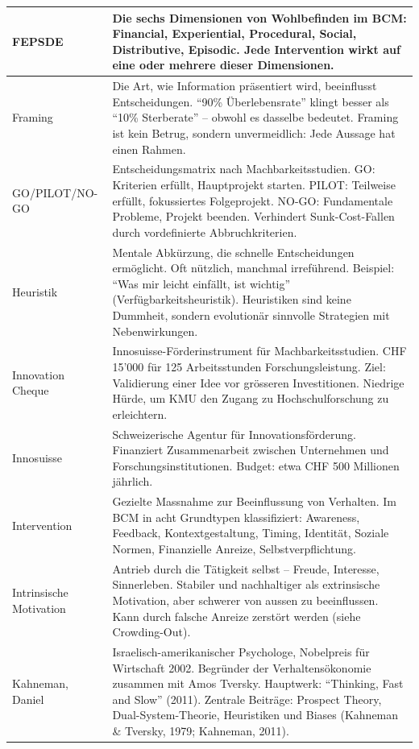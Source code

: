 \documentclass[11pt,a4paper]{article}
\begin{document}
\begin{longtable}{@{}L{4cm}L{10cm}@{}}
\midrule
FEPSDE & Die sechs Dimensionen von Wohlbefinden im BCM: Financial, Experiential, Procedural, Social, Distributive, Episodic. Jede Intervention wirkt auf eine oder mehrere dieser Dimensionen. \\
\midrule
Framing & Die Art, wie Information präsentiert wird, beeinflusst Entscheidungen. ``90\% Überlebensrate'' klingt besser als ``10\% Sterberate'' -- obwohl es dasselbe bedeutet. Framing ist kein Betrug, sondern unvermeidlich: Jede Aussage hat einen Rahmen. \\
\midrule
GO/PILOT/NO-GO & Entscheidungsmatrix nach Machbarkeitsstudien. GO: Kriterien erfüllt, Hauptprojekt starten. PILOT: Teilweise erfüllt, fokussiertes Folgeprojekt. NO-GO: Fundamentale Probleme, Projekt beenden. Verhindert Sunk-Cost-Fallen durch vordefinierte Abbruchkriterien. \\
\midrule
Heuristik & Mentale Abkürzung, die schnelle Entscheidungen ermöglicht. Oft nützlich, manchmal irreführend. Beispiel: ``Was mir leicht einfällt, ist wichtig'' (Verfügbarkeitsheuristik). Heuristiken sind keine Dummheit, sondern evolutionär sinnvolle Strategien mit Nebenwirkungen. \\
\midrule
Innovation Cheque & Innosuisse-Förderinstrument für Machbarkeitsstudien. CHF 15'000 für 125 Arbeitsstunden Forschungsleistung. Ziel: Validierung einer Idee vor grösseren Investitionen. Niedrige Hürde, um KMU den Zugang zu Hochschulforschung zu erleichtern. \\
\midrule
Innosuisse & Schweizerische Agentur für Innovationsförderung. Finanziert Zusammenarbeit zwischen Unternehmen und Forschungsinstitutionen. Budget: etwa CHF 500 Millionen jährlich. \\
\midrule
Intervention & Gezielte Massnahme zur Beeinflussung von Verhalten. Im BCM in acht Grundtypen klassifiziert: Awareness, Feedback, Kontextgestaltung, Timing, Identität, Soziale Normen, Finanzielle Anreize, Selbstverpflichtung. \\
\midrule
Intrinsische Motivation & Antrieb durch die Tätigkeit selbst -- Freude, Interesse, Sinnerleben. Stabiler und nachhaltiger als extrinsische Motivation, aber schwerer von aussen zu beeinflussen. Kann durch falsche Anreize zerstört werden (siehe Crowding-Out). \\
\midrule
Kahneman, Daniel & Israelisch-amerikanischer Psychologe, Nobelpreis für Wirtschaft 2002. Begründer der Verhaltensökonomie zusammen mit Amos Tversky. Hauptwerk: ``Thinking, Fast and Slow'' (2011). Zentrale Beiträge: Prospect Theory, Dual-System-Theorie, Heuristiken und Biases (Kahneman \& Tversky, 1979; Kahneman, 2011). \\

\end{longtable}
\end{document}

